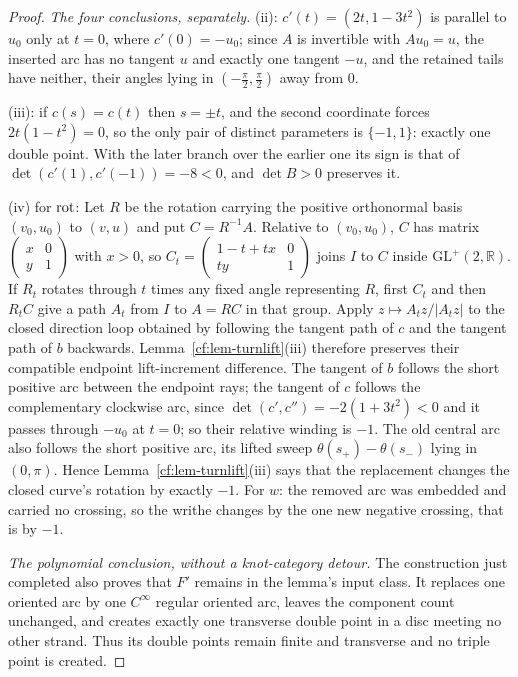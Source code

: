 \begin{proof}
\emph{The four conclusions, separately.} (ii): $c'(t)=(2t,1-3t^2)$ is parallel to
$u_0$ only at $t=0$, where $c'(0)=-u_0$; since $A$ is invertible with
$Au_0=u$, the inserted arc has no tangent $u$ and exactly one tangent $-u$, and
the retained tails have neither, their angles lying in $(-\tfrac\pi2,\tfrac\pi2)$
away from $0$.

(iii): if $c(s)=c(t)$ then $s=\pm t$, and the second coordinate forces
$2t(1-t^2)=0$, so the only pair of distinct parameters is $\{-1,1\}$: exactly
one double point. With the later branch over the earlier one its sign is that of
$\det(c'(1),c'(-1))=-8<0$, and $\det B>0$ preserves it.

(iv) for $\operatorname{rot}$: Let $R$ be the rotation carrying the positive orthonormal basis
$(v_0,u_0)$ to $(v,u)$ and put $C=R^{-1}A$. Relative to $(v_0,u_0)$,
$C$ has matrix
$\left(\begin{smallmatrix}x&0\\y&1\end{smallmatrix}\right)$ with $x>0$, so
$C_t=\left(\begin{smallmatrix}1-t+tx&0\\ty&1\end{smallmatrix}\right)$
joins $I$ to $C$ inside $\mathrm{GL}^+(2,\mathbb R)$. If $R_t$ rotates
through $t$ times any fixed angle representing $R$, first $C_t$ and then
$R_tC$ give a path $A_t$ from $I$ to $A=RC$ in that group. Apply
$z\mapsto A_tz/|A_tz|$ to the closed direction loop obtained by following
the tangent path of $c$ and the tangent path of $b$ backwards.
Lemma~\ref{cf:lem-turnlift}(iii) therefore preserves their compatible endpoint
lift-increment difference. The tangent of $b$ follows the short positive arc between the
endpoint rays; the tangent of $c$ follows the complementary clockwise arc, since
$\det(c',c'')=-2(1+3t^2)<0$ and it passes through $-u_0$ at $t=0$; so their
relative winding is $-1$. The old central arc also follows the short positive
arc, its lifted sweep $\theta(s_+)-\theta(s_-)$ lying in $(0,\pi)$. Hence Lemma~\ref{cf:lem-turnlift}(iii) says that the replacement changes the
closed curve's rotation by exactly $-1$. For
$w$: the removed arc was embedded and carried no crossing, so the writhe changes
by the one new negative crossing, that is by $-1$.

\emph{The polynomial conclusion, without a knot-category detour.}
The construction just completed also proves that $F'$ remains in the lemma's
input class.  It replaces one oriented arc by one $C^\infty$ regular oriented
arc, leaves the component count unchanged, and creates exactly one transverse
double point in a disc meeting no other strand.  Thus its double points remain
finite and transverse and no triple point is created.


\end{proof}
